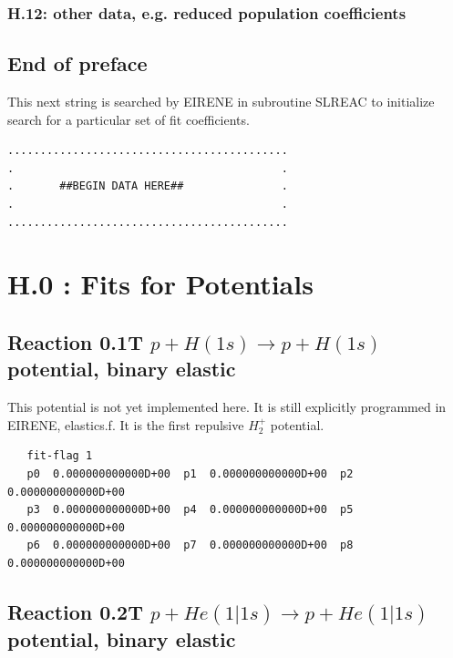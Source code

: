 \documentclass[12pt,dvips]{article}
\begin{document}
\subsubsection*{H.12: other data, e.g. reduced population coefficients}
\subsection*{End of preface}
This next string is searched by EIRENE in subroutine SLREAC
to initialize search for a particular set of fit coefficients.

\bigskip
\begin{small}\begin{verbatim}
...........................................
.                                         .
.       ##BEGIN DATA HERE##               .
.                                         .
...........................................
\end{verbatim}\end{small}
\newpage

\setcounter{section}{-1}
\section{H.0 :  Fits for Potentials}\label{secpot}

\subsection{
Reaction 0.1T $ p + H (1s) \rightarrow p + H (1s) $ potential, binary elastic }
This potential is not yet implemented here. It is still explicitly
programmed in EIRENE, elastics.f. It is the first repulsive $H_2^+$
potential.

\begin{small}\begin{verbatim}
   fit-flag 1
   p0  0.000000000000D+00  p1  0.000000000000D+00  p2  0.000000000000D+00
   p3  0.000000000000D+00  p4  0.000000000000D+00  p5  0.000000000000D+00
   p6  0.000000000000D+00  p7  0.000000000000D+00  p8  0.000000000000D+00
\end{verbatim}\end{small}


\newpage

\subsection{
Reaction 0.2T   $ p + He(1|1s) \rightarrow p + He (1|1s) $
potential, binary elastic}
\end{document}
